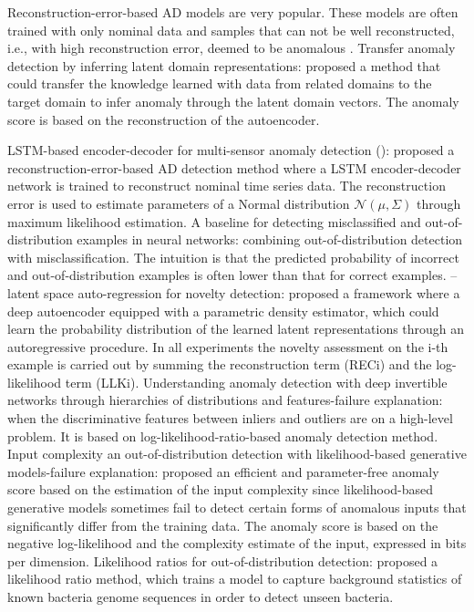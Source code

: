 \documentclass[pmlr]{jmlr}%
\begin{document}
Reconstruction-error-based AD models are very popular. These models are often trained with only nominal data and samples that can not be well reconstructed, i.e., with high reconstruction error, deemed to be anomalous \cite{kumagai2019transfer}.
\cite{kumagai2019transfer} Transfer anomaly detection by inferring latent domain representations: proposed a method that could transfer the knowledge learned with data from related domains to the target domain to infer anomaly through the latent domain vectors. The anomaly score is based on the reconstruction of the autoencoder.

\cite{malhotra2016lstm} LSTM-based encoder-decoder for multi-sensor anomaly detection (): proposed a reconstruction-error-based AD detection method where a LSTM encoder-decoder network is trained to reconstruct nominal time series data. The reconstruction error is used to estimate parameters of a Normal distribution $\mathcal{N}(\mu, \Sigma)$ through maximum likelihood estimation.
\cite{hendrycks2016baseline} A baseline for detecting misclassified and out-of-distribution examples in neural networks: combining out-of-distribution detection with misclassification. The intuition is that the predicted probability of incorrect and out-of-distribution examples is often lower than that for correct examples.
\cite{abati2019latent}--latent space auto-regression for novelty detection: proposed a framework where a deep autoencoder equipped with a parametric density estimator, which could learn the probability distribution of the learned latent representations through an autoregressive procedure. In all experiments the novelty assessment on the i-th example is carried out by summing the reconstruction term (RECi) and the log-likelihood term (LLKi). 
\cite{schirrmeister2020understanding} Understanding anomaly detection with deep invertible networks through hierarchies of distributions and features-failure explanation: when the discriminative features between inliers and outliers are on a high-level problem. It is based on log-likelihood-ratio-based anomaly detection method.
\cite{serra2019input} Input complexity an out-of-distribution detection with likelihood-based generative models-failure explanation: proposed an efficient and parameter-free anomaly score based on the estimation of the input complexity since likelihood-based generative models sometimes fail to detect certain forms of anomalous inputs that significantly differ from the training data. The anomaly score is based on the negative log-likelihood and the complexity estimate of the input, expressed in bits per dimension.
\cite{ren2019likelihood} %
Likelihood ratios for out-of-distribution detection: proposed a likelihood ratio method, which trains a model to capture background statistics of known bacteria genome sequences in order to detect unseen bacteria. 
\end{document}

